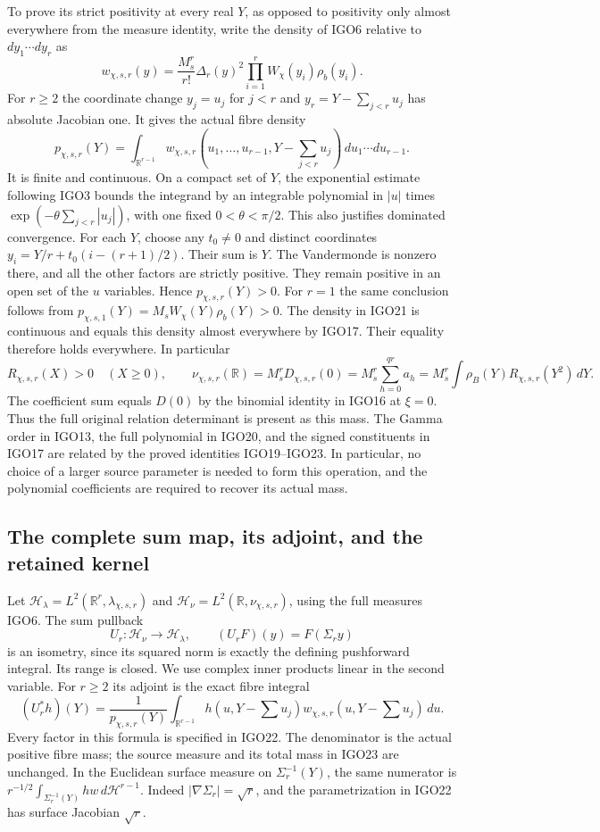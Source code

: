 \documentclass[11pt,a4paper]{article}
\begin{document}
To prove its strict positivity at every real $Y$, as opposed to
positivity only almost everywhere from the measure identity,
write the density of IGO6 relative to $dy_1\cdots dy_r$ as
\[
 w_{\chi,s,r}(y)
  =\frac{M_s^r}{r!}\Delta_r(y)^2
                  \prod_{i=1}^r W_\chi(y_i)\rho_b(y_i).
\]
For $r\geq2$ the coordinate change
$y_j=u_j$ for $j<r$ and $y_r=Y-\sum_{j<r}u_j$ has
absolute Jacobian one. It gives the actual fibre density
\[
 p_{\chi,s,r}(Y)=\int_{\mathbb R^{r-1}}
 w_{\chi,s,r}(u_1,\ldots,u_{r-1},Y-\textstyle\sum_{j<r}u_j)
                 \,du_1\cdots du_{r-1}.
 \tag{IGO22}
\]
It is finite and continuous. On a compact set of $Y$, the
exponential estimate following IGO3 bounds the integrand by
an integrable polynomial in $|u|$ times
$\exp(-\theta\sum_{j<r}|u_j|)$, with one fixed
$0<\theta<\pi/2$. This also justifies dominated convergence.
For each $Y$, choose any $t_0\ne0$ and distinct coordinates
$y_i=Y/r+t_0(i-(r+1)/2)$. Their sum is $Y$.
The Vandermonde is nonzero there, and all the other factors
are strictly positive. They remain positive in an open set
of the $u$ variables. Hence $p_{\chi,s,r}(Y)>0$.
For $r=1$ the same conclusion follows from
$p_{\chi,s,1}(Y)=M_s W_\chi(Y)\rho_b(Y)>0$.
The density in IGO21 is continuous and equals this density
almost everywhere by IGO17. Their equality therefore holds
everywhere. In particular
\[
 R_{\chi,s,r}(X)>0\quad(X\geq0),\qquad
 \nu_{\chi,s,r}(\mathbb R)
 =M_s^rD_{\chi,s,r}(0)
 =M_s^r\sum_{h=0}^{qr}a_h
 =M_s^r\int\rho_B(Y)R_{\chi,s,r}(Y^2)\,dY.
 \tag{IGO23}
\]
The coefficient sum equals $D(0)$ by the binomial identity in
IGO16 at $\xi=0$. Thus the full original relation determinant
is present as this mass. The Gamma order in IGO13, the full
polynomial in IGO20, and the signed constituents in IGO17 are
related by the proved identities IGO19--IGO23. In particular,
no choice of a larger source parameter is needed to form
this operation, and the polynomial coefficients are required
to recover its actual mass.

\subsection{The complete sum map, its adjoint, and the retained kernel}
Let $\mathcal H_{\lambda}=L^2(\mathbb R^r,\lambda_{\chi,s,r})$
and $\mathcal H_{\nu}=L^2(\mathbb R,\nu_{\chi,s,r})$, using
the full measures IGO6. The sum pullback
\[
 U_r:\mathcal H_{\nu}\longrightarrow\mathcal H_{\lambda},
 \qquad (U_rF)(y)=F(\Sigma_r y)
 \tag{IGO24}
\]
is an isometry, since its squared norm is exactly the defining
pushforward integral. Its range is closed. We use complex
inner products linear in the second variable. For $r\geq2$
its adjoint is the exact fibre integral
\[
 (U_r^*h)(Y)=\frac{1}{p_{\chi,s,r}(Y)}
  \int_{\mathbb R^{r-1}}
    h(u,Y-\textstyle\sum u_j)
    w_{\chi,s,r}(u,Y-\textstyle\sum u_j)\,du.
 \tag{IGO25}
\]
Every factor in this formula is specified in IGO22. The
denominator is the actual positive fibre mass; the source
measure and its total mass in IGO23 are unchanged. In the
Euclidean surface measure on $\Sigma_r^{-1}(Y)$, the same
numerator is $r^{-1/2}\int_{\Sigma_r^{-1}(Y)}hw\,d\mathcal H^{r-1}$.
Indeed $|\nabla\Sigma_r|=\sqrt r$, and the parametrization
in IGO22 has surface Jacobian $\sqrt r$.
\end{document}
